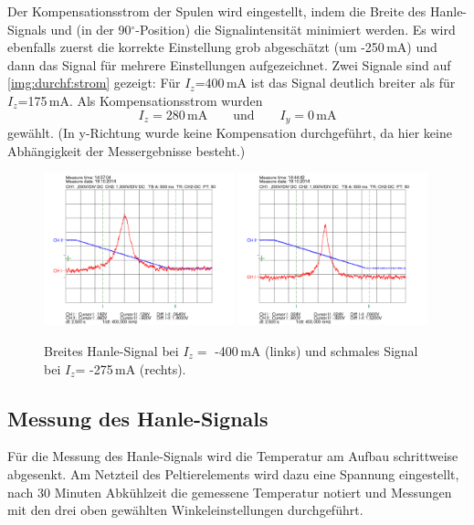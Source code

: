 Der Kompensationsstrom der Spulen wird eingestellt, indem die Breite des Hanle-Signals und
(in der 90$^\circ$-Position) die Signalintensität minimiert werden.
Es wird ebenfalls zuerst die korrekte Einstellung grob abgeschätzt (um -250\,mA)
und dann das Signal für mehrere Einstellungen aufgezeichnet.
Zwei Signale sind auf \autoref{img:durchf:strom} gezeigt:
Für $I_z$=400\,mA ist das Signal deutlich breiter als für $I_z$=175\,mA.
Als Kompensationsstrom wurden 
\begin{equation}
\label{eq:calcurr}
 I_z=280\,\text{mA} \qquad \text{und} \qquad I_y=0\,\text{mA}
\end{equation}
gewählt. (In y-Richtung wurde keine Kompensation durchgeführt,
da hier keine Abhängigkeit der Messergebnisse besteht.)
\begin{figure}[H]
\begin{center}
  \includegraphics[width=0.49\textwidth]{../data/2/-17_5X-40.png}
    \includegraphics[width=0.49\textwidth]{../data/2/-17_5X-27_5.png}
  \caption{Breites Hanle-Signal bei $I_z=$ -400\,mA (links) und schmales Signal bei $I_z$= -275\,mA (rechts).}
  \label{img:durchf:strom}
\end{center}
\end{figure}



\subsection{Messung des Hanle-Signals}

Für die Messung des Hanle-Signals wird die Temperatur am Aufbau schrittweise abgesenkt.
Am Netzteil des Peltierelements wird dazu eine Spannung eingestellt, nach 30 Minuten Abkühlzeit
die gemessene Temperatur notiert und Messungen mit den drei oben gewählten Winkeleinstellungen durchgeführt.


